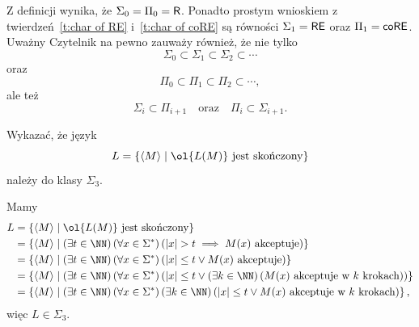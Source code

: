 Z definicji wynika, że $\Sigma_0 = \Pi_0 = \textsf{R}$. Ponadto prostym wnioskiem z twierdzeń~\ref{t:char of RE} i~\ref{t:char of coRE} są równości $\Sigma_1 = \textsf{RE}$ oraz $\Pi_1 = \textsf{coRE}$. Uważny Czytelnik na pewno zauważy również, że nie tylko
\[ \Sigma_0 \subset \Sigma_1 \subset \Sigma_2 \subset \cdots \]
oraz
\[ \Pi_0 \subset \Pi_1 \subset \Pi_2 \subset \cdots, \]
ale też
\[ \Sigma_i \subset \Pi_{i + 1} \quad\text{oraz}\quad \Pi_i \subset \Sigma_{i+1}. \]

\begin{example}
    Wykazać, że język
    \[ L = \left\{\encode{M} \mid \ol{L(M)} \text{ jest skończony}\right\} \]
    należy do klasy $\Sigma_3$.
\end{example}
\begin{solution}
Mamy
    \begin{align*}
        L &= \left\{\encode{M} \mid \ol{L(M)} \text{ jest skończony}\right\} \\
        &= \left\{\encode{M} \mid \left(\exists t \in \NN\right) \left(\forall x \in \Sigma^*\right) \left(|x| > t \implies M(x) \text{ akceptuje}\right)\right\} \\
        &= \left\{\encode{M} \mid \left(\exists t \in \NN\right) \left(\forall x \in \Sigma^*\right) \left(|x| \leq t \lor M(x) \text{ akceptuje}\right)\right\} \\
        &= \left\{\encode{M} \mid \left(\exists t \in \NN\right) \left(\forall x \in \Sigma^*\right) \left(|x| \leq t \lor \left(\exists k \in \NN\right) \left(M(x) \text{ akceptuje w } k \text{ krokach}\right)\right)\right\} \\
        &= \left\{\encode{M} \mid \left(\exists t \in \NN\right) \left(\forall x \in \Sigma^*\right) \left(\exists k \in \NN\right) \left(|x| \leq t \lor M(x) \text{ akceptuje w } k \text{ krokach}\right)\right\},
    \end{align*}
    więc $L \in \Sigma_3$.
\end{solution}

